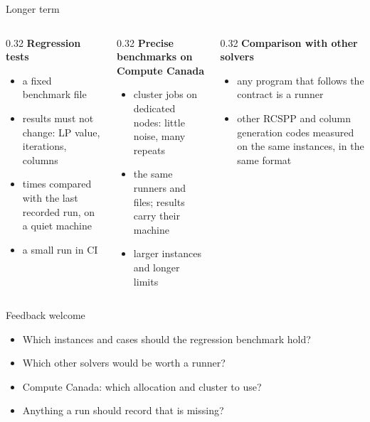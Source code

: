\documentclass[aspectratio=169]{beamer}
\begin{document}
\begin{frame}{Longer term}
  \begin{columns}[T]
    \begin{column}{0.32\textwidth}
      \textbf{Regression tests}
      \begin{itemize}\small
        \item a fixed benchmark file
        \item results must not change: LP value, iterations, columns
        \item times compared with the last recorded run, on a quiet machine
        \item a small run in CI
      \end{itemize}
    \end{column}
    \begin{column}{0.32\textwidth}
      \textbf{Precise benchmarks on Compute Canada}
      \begin{itemize}\small
        \item cluster jobs on dedicated nodes: little noise, many repeats
        \item the same runners and files; results carry their machine
        \item larger instances and longer limits
      \end{itemize}
    \end{column}
    \begin{column}{0.32\textwidth}
      \textbf{Comparison with other solvers}
      \begin{itemize}\small
        \item any program that follows the contract is a runner
        \item other RCSPP and column generation codes measured on the same instances, in the same format
      \end{itemize}
    \end{column}
  \end{columns}
\end{frame}

\begin{frame}{Feedback welcome}
  \begin{itemize}
    \item Which instances and cases should the regression benchmark hold?
    \item Which other solvers would be worth a runner?
    \item Compute Canada: which allocation and cluster to use?
    \item Anything a run should record that is missing?
  \end{itemize}
\end{frame}
\end{document}
